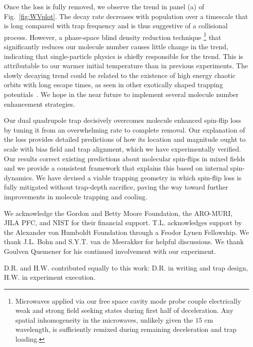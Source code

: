 \documentclass[%
 reprint,
groupedaddress,
 amsmath,amssymb,
 aps,
prl,
]{revtex4-1}
\begin{document}
Once the loss is fully removed, we observe the trend in panel (a) of Fig.~\ref{fig:WVplot}. The decay rate decreases with population over a timescale that is long compared with trap frequency and is thus suggestive of a collisional process. However, a phase-space blind density reduction technique \footnote{Microwaves applied via our free space cavity mode probe couple electrically weak and strong field seeking states during first half of deceleration. Any spatial inhomogeneity in the microwaves, unlikely given the $15\text{ cm}$ wavelength, is sufficiently remixed during remaining deceleration and trap loading.} that significantly reduces our molecule number causes little change in the trend, indicating that single-particle physics is chiefly responsible for the trend. This is attributable to our warmer initial temperature than in previous experiments. The slowly decaying trend could be related to the existence of high energy chaotic orbits with long escape times, as seen in other exotically shaped trapping potentials~\cite{Gonzalez-Ferez2014}. We hope in the near future to implement several molecule number enhancement strategies.

Our dual quadrupole trap decisively overcomes molecule enhanced spin-flip loss by tuning it from an overwhelming rate to complete removal. Our explanation of the loss provides detailed predictions of how its location and magnitude ought to scale with bias field and trap alignment, which we have experimentally verified. Our results correct existing predictions about molecular spin-flips in mixed fields and we provide a consistent framework that explains this based on internal spin-dynamics. We have devised a viable trapping geometry in which spin-flip loss is fully mitigated without trap-depth sacrifice, paving the way toward further improvements in molecule trapping and cooling.

We acknowledge the Gordon and Betty Moore Foundation, the ARO-MURI, JILA PFC, and NIST for their financial support. T.L. acknowledges support by the Alexander von Humboldt Foundation through a Feodor Lynen Fellowship. We thank J.L. Bohn and S.Y.T. van de Meerakker for helpful discussions. We thank Goulven Quemener for his continued involvement with our experiment.

D.R. and H.W. contributed equally to this work: D.R. in writing and trap design, H.W. in experiment execution.


\end{document}
